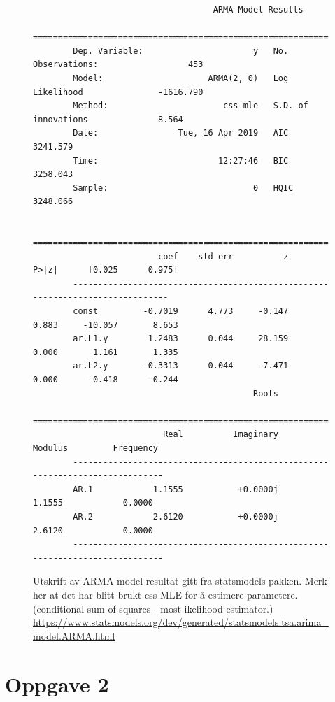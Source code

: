 \begin{figure}[hbt!]
    \begin{lstlisting}
                                    ARMA Model Results
        ==============================================================================
        Dep. Variable:                      y   No. Observations:                  453
        Model:                     ARMA(2, 0)   Log Likelihood               -1616.790
        Method:                       css-mle   S.D. of innovations              8.564
        Date:                Tue, 16 Apr 2019   AIC                           3241.579
        Time:                        12:27:46   BIC                           3258.043
        Sample:                             0   HQIC                          3248.066
        
        ==============================================================================
                         coef    std err          z      P>|z|      [0.025      0.975]
        ------------------------------------------------------------------------------
        const         -0.7019      4.773     -0.147      0.883     -10.057       8.653
        ar.L1.y        1.2483      0.044     28.159      0.000       1.161       1.335
        ar.L2.y       -0.3313      0.044     -7.471      0.000      -0.418      -0.244
                                            Roots
        =============================================================================
                          Real          Imaginary           Modulus         Frequency
        -----------------------------------------------------------------------------
        AR.1            1.1555           +0.0000j            1.1555            0.0000
        AR.2            2.6120           +0.0000j            2.6120            0.0000
        -----------------------------------------------------------------------------
    \end{lstlisting}
\caption{Utskrift av ARMA-model resultat gitt fra statsmodels-pakken. Merk her at det har blitt brukt css-MLE for å estimere parametere.(conditional sum of squares - most ikelihood estimator.) \url{https://www.statsmodels.org/dev/generated/statsmodels.tsa.arima\_model.ARMA.html}}
\label{Armacoefs}
\end{figure}



\section{Oppgave 2}
